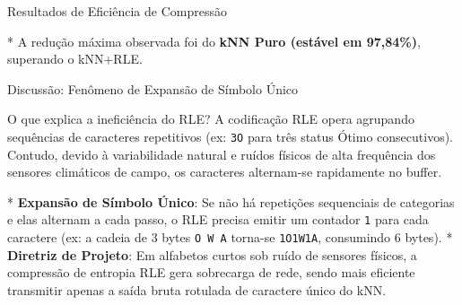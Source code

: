 \documentclass[aspectratio=169]{beamer}
\begin{document}
\begin{frame}{Resultados de Eficiência de Compressão}
  \begin{table}[h]
    \centering
    \caption{Tamanho médio acumulado e redução de dados por tamanho de lote.}
    \label{tab:compressao_lote}
  \end{table}
  \vspace{-0.1cm}
  * A redução máxima observada foi do \textbf{kNN Puro (estável em 97,84\%)}, superando o kNN+RLE.
\end{frame}

\begin{frame}{Discussão: Fenômeno de Expansão de Símbolo Único}
  \begin{block}{O que explica a ineficiência do RLE?}
    A codificação RLE opera agrupando sequências de caracteres repetitivos (ex: \texttt{3O} para três status Ótimo consecutivos). Contudo, devido à variabilidade natural e ruídos físicos de alta frequência dos sensores climáticos de campo, os caracteres alternam-se rapidamente no buffer.
  \end{block}
  \vspace{0.2cm}
  * \textbf{Expansão de Símbolo Único}: Se não há repetições sequenciais de categorias e elas alternam a cada passo, o RLE precisa emitir um contador \texttt{1} para cada caractere (ex: a cadeia de 3 bytes \texttt{O W A} torna-se \texttt{1O1W1A}, consumindo 6 bytes).
  * \textbf{Diretriz de Projeto}: Em alfabetos curtos sob ruído de sensores físicos, a compressão de entropia RLE gera sobrecarga de rede, sendo mais eficiente transmitir apenas a saída bruta rotulada de caractere único do kNN.
\end{frame}

\end{document}
